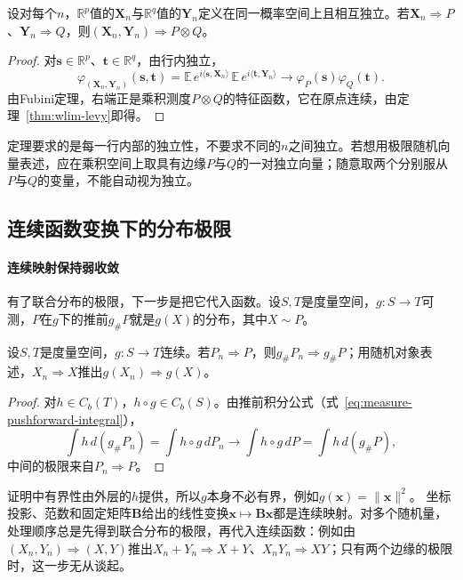 \begin{theorem}[行内独立的联合极限]
\label{thm:wlim-independent-product}
设对每个$n$，$\mathbb R^p$值的$\bm X_n$与$\mathbb R^q$值的$\bm Y_n$定义在同一概率空间上且相互独立。若$\bm X_n\Rightarrow P$、$\bm Y_n\Rightarrow Q$，则$(\bm X_n,\bm Y_n)\Rightarrow P\otimes Q$。
\end{theorem}

\begin{proof}
对$\bm s\in\mathbb R^p$、$\bm t\in\mathbb R^q$，由行内独立，
\[
  \varphi_{(\bm X_n,\bm Y_n)}(\bm s,\bm t)=\mathbb E\,e^{i\langle\bm s,\bm X_n\rangle}\,\mathbb E\,e^{i\langle\bm t,\bm Y_n\rangle}\to\varphi_P(\bm s)\varphi_Q(\bm t).
\]
由Fubini定理，右端正是乘积测度$P\otimes Q$的特征函数，它在原点连续，由定理~\ref{thm:wlim-levy}即得。
\end{proof}

定理要求的是每一行内部的独立性，不要求不同的$n$之间独立。若想用极限随机向量表述，应在乘积空间上取具有边缘$P$与$Q$的一对独立向量；随意取两个分别服从$P$与$Q$的变量，不能自动视为独立。

\subsection{连续函数变换下的分布极限}

\paragraph{连续映射保持弱收敛}
有了联合分布的极限，下一步是把它代入函数。设$S,T$是度量空间，$g:S\to T$可测，$P$在$g$下的推前$g_\#P$就是$g(X)$的分布，其中$X\sim P$。

\begin{theorem}
\label{thm:wlim-continuous-mapping}
设$S,T$是度量空间，$g:S\to T$连续。若$P_n\Rightarrow P$，则$g_\#P_n\Rightarrow g_\#P$；用随机对象表述，$X_n\Rightarrow X$推出$g(X_n)\Rightarrow g(X)$。
\end{theorem}

\begin{proof}
对$h\in C_b(T)$，$h\circ g\in C_b(S)$。由推前积分公式（式~\eqref{eq:measure-pushforward-integral}），
\[
  \int h\,d(g_\#P_n)=\int h\circ g\,dP_n\to\int h\circ g\,dP=\int h\,d(g_\#P),
\]
中间的极限来自$P_n\Rightarrow P$。
\end{proof}

证明中有界性由外层的$h$提供，所以$g$本身不必有界，例如$g(\bm x)=\lVert\bm x\rVert^2$。
坐标投影、范数和固定矩阵$\bm B$给出的线性变换$\bm x\mapsto\bm B\bm x$都是连续映射。对多个随机量，处理顺序总是先得到联合分布的极限，再代入连续函数：例如由$(X_n,Y_n)\Rightarrow(X,Y)$推出$X_n+Y_n\Rightarrow X+Y$、$X_nY_n\Rightarrow XY$；只有两个边缘的极限时，这一步无从谈起。


